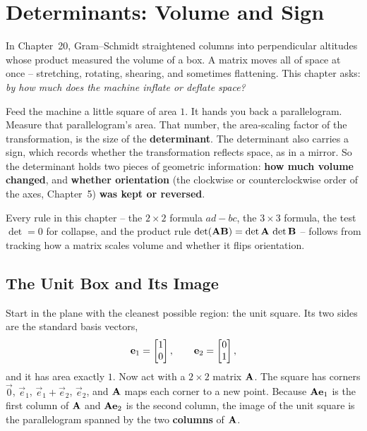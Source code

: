 \chapter{Determinants: Volume and Sign}

In Chapter~20, Gram--Schmidt straightened columns into perpendicular altitudes whose product
measured the volume of a box. A matrix moves all of space at once --
stretching, rotating, shearing, and sometimes flattening. This chapter asks: \emph{by how much does the machine inflate or
deflate space?}

Feed the machine a little square of area $1$. It hands you back a parallelogram.
Measure that parallelogram's area. That number, the area-scaling factor
of the transformation, is the size of the \textbf{determinant}. The determinant
also carries a sign, which records whether the transformation reflects space, as
in a mirror. So the determinant holds two pieces of geometric information:
\textbf{how much volume changed}, and \textbf{whether orientation} (the
clockwise or counterclockwise order of the axes, Chapter~5) \textbf{was kept or
reversed}.

Every rule in this chapter -- the $2\times 2$ formula $ad-bc$, the
$3\times 3$ formula, the test $\det = 0$ for collapse, and the product rule
$\det(\mathbf{A}\mathbf{B}) = \det\mathbf{A}\,\det\mathbf{B}$ -- follows from tracking
how a matrix scales volume and whether it flips orientation.

\section{The Unit Box and Its Image}
\label{ch21:unit-box}

Start in the plane with the cleanest possible region: the unit square. Its two
sides are the standard basis vectors,
\[
  \mathbf{e}_1 = \begin{bmatrix}1\\0\end{bmatrix}, \qquad \mathbf{e}_2 = \begin{bmatrix}0\\1\end{bmatrix},
\]
and it has area exactly $1$. Now act with a $2\times 2$ matrix $\mathbf{A}$. The
square has corners $\vec{0}$, $\vec{e}_1$, $\vec{e}_1+\vec{e}_2$, $\vec{e}_2$, and
$\mathbf{A}$ maps each corner to a new point. Because $\mathbf{A}\mathbf{e}_1$ is the
first column of $\mathbf{A}$ and $\mathbf{A}\mathbf{e}_2$ is the second column, the image
of the unit square is the parallelogram spanned by the two \textbf{columns} of
$\mathbf{A}$.

